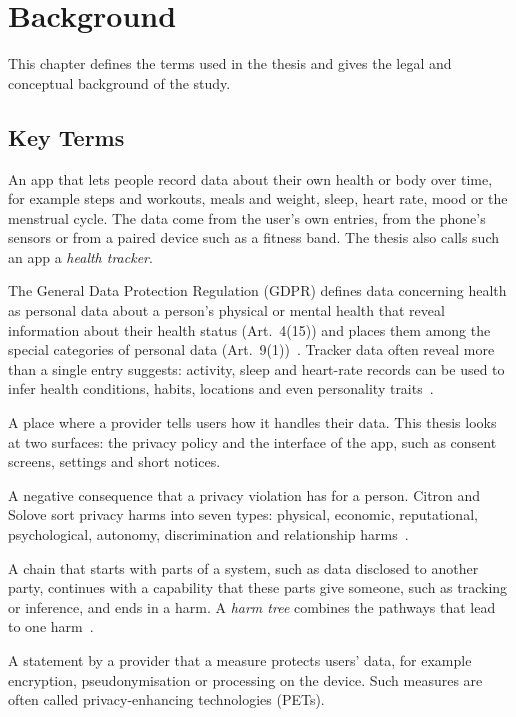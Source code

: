 \chapter{Background}
\label{ch:background}

This chapter defines the terms used in the thesis and gives the legal and
conceptual background of the study.

\section{Key Terms}
\label{sec:terms}
\begin{description}[leftmargin=1.2em,labelindent=0pt,itemsep=2pt,
                    font=\normalfont\bfseries]
  \item[Health tracking app.] An app that lets people record data about their
    own health or body over time, for example steps and workouts, meals and
    weight, sleep, heart rate, mood or the menstrual cycle. The data come from
    the user's own entries, from the phone's sensors or from a paired device
    such as a fitness band. The thesis also calls such an app a
    \emph{health tracker}.
  \item[Health data.] The General Data Protection Regulation (GDPR) defines
    data concerning health as personal data about a person's physical or
    mental health that reveal information about their health status
    (Art.~4(15)) and places them among the special categories of personal data
    (Art.~9(1))~\parencite{gdpr2016}. Tracker data often reveal more than a
    single entry suggests: activity, sleep and heart-rate records can be used
    to infer health conditions, habits, locations and even personality
    traits~\parencite[\S4]{niksirat2024wearable}.
  \item[Surface.] A place where a provider tells users how it handles their
    data. This thesis looks at two surfaces: the privacy policy and the
    interface of the app, such as consent screens, settings and short notices.
  \item[Privacy harm.] A negative consequence that a privacy violation has for
    a person. Citron and Solove sort privacy harms into seven types: physical,
    economic, reputational, psychological, autonomy, discrimination and
    relationship harms~\parencite{citron2021harms}.
  \item[Pathway to harm.] A chain that starts with parts of a system, such as
    data disclosed to another party, continues with a capability that these
    parts give someone, such as tracking or inference, and ends in a harm. A
    \emph{harm tree} combines the pathways that lead to one
    harm~\parencite[\S4.1]{knabenhans2026harms}.
  \item[Protection claim.] A statement by a provider that a measure protects
    users' data, for example encryption, pseudonymisation or processing on the
    device. Such measures are often called privacy-enhancing technologies
    (PETs).
\end{description}

